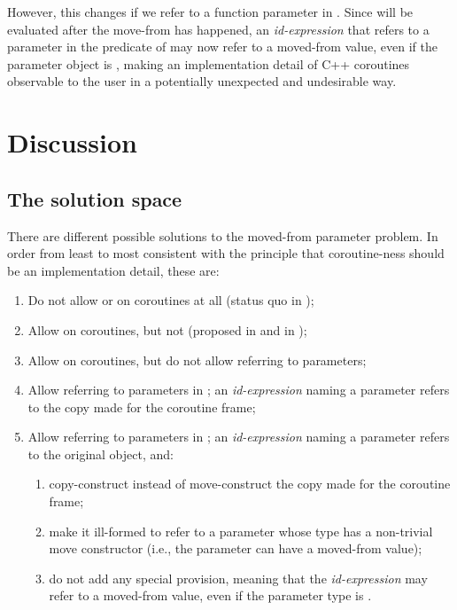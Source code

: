 However, this changes if we refer to a function parameter in . Since  will be evaluated after the move-from has happened, an \emph{id-expression} that refers to a parameter in the predicate of  may now refer to a moved-from value, even if the parameter object is , making an implementation detail of C++ coroutines observable to the user in a potentially unexpected and undesirable way.

\section {Discussion}

\subsection{The solution space}
There are different possible solutions to the moved-from parameter problem. In order from least to most consistent with the principle that coroutine-ness should be an implementation detail, these are:
\begin{enumerate}
\item Do not allow  or  on coroutines at all (status quo in \cite{P2900R8});
\item Allow  on coroutines, but not  (proposed in \cite{P2957R1} and in \cite{P3251R0});
\item Allow  on coroutines, but do not allow referring to parameters;
\item Allow referring to parameters in ; an \emph{id-expression} naming a parameter refers to the copy made for the coroutine frame;
\item Allow referring to parameters in ; an \emph{id-expression} naming a parameter refers to the original object, and:
\begin{enumerate}[label=\alph*.,ref=\theenumi\alph*]
        \item copy-construct instead of move-construct the copy made for the coroutine frame;
        \item make it ill-formed to refer to a parameter whose type has a non-trivial move constructor (i.e., the parameter can have a moved-from value);
        \item do not add any special provision, meaning that the \emph{id-expression} may refer to a moved-from value, even if the parameter type is .
\end{enumerate}
\end{enumerate}

